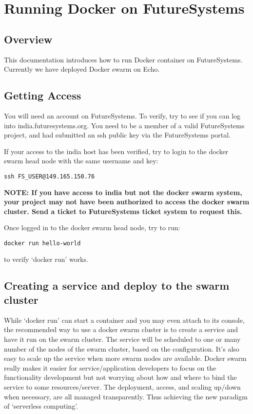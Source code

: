 \chapter{Running Docker on FutureSystems}\label{S:docker-fg}

\FILENAME

\section{Overview}\label{overview}

This documentation introduces how to run Docker container on
FutureSystems. Currently we have deployed Docker swarm on Echo.

\section{Getting Access}\label{getting-access}

You will need an account on FutureSystems. To verify, try to see if you
can log into india.futuresystems.org. You need to be a member of a valid
FutureSystems project, and had submitted an ssh public key via the
FutureSystems portal.

If your access to the india host has been verified, try to login to the
docker swarm head node with the same username and key:

\begin{verbatim}
ssh FS_USER@149.165.150.76
\end{verbatim}

\textbf{NOTE: If you have access to india but not the docker swarm
system, your project may not have been authorized to access the docker
swarm cluster. Send a ticket to FutureSystems ticket system to request
this.}

Once logged in to the docker swarm head node, try to run:

\begin{verbatim}
docker run hello-world
\end{verbatim}

to verify `docker run' works.

\section{Creating a service and deploy to the swarm
cluster}\label{creating-a-service-and-deploy-to-the-swarm-cluster}

While `docker run' can start a container and you may even attach to its
console, the recommended way to use a docker swarm cluster is to create
a service and have it run on the swarm cluster. The service will be
scheduled to one or many number of the nodes of the swarm cluster, based
on the configuration. It's also easy to scale up the service when more
swarm nodes are available. Docker swarm really makes it easier for
service/application developers to focus on the functionality development
but not worrying about how and where to bind the service to some
resources/server. The deployment, access, and scaling up/down when
necessary, are all managed transparently. Thus achieving the new
paradigm of `serverless computing'.

